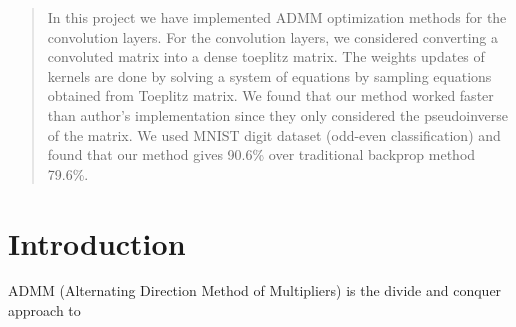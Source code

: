 \documentclass[12pt]{article}
\begin{document}
\maketitle

\begin{abstract}
In this project we have implemented ADMM optimization methods for the convolution layers.
For the convolution layers, we considered converting a convoluted matrix into a dense toeplitz matrix.
The weights updates of kernels are done by solving a system of equations by sampling equations obtained from Toeplitz matrix.
We found that our method worked faster than author's implementation since they only considered the pseudoinverse of the matrix.
We used MNIST digit dataset (odd-even classification) and found that our method gives 90.6\% over traditional backprop method 79.6\%.
\end{abstract}

\section{Introduction}
ADMM (Alternating Direction Method of Multipliers) is the divide and conquer approach to  



\end{document}
